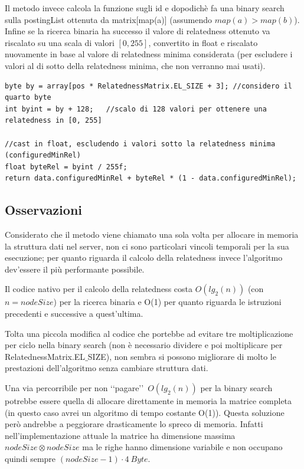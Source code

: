 Il metodo  invece calcola la funzione  sugli id  e  dopodichè fa una binary search sulla postingList 
ottenuta da matrix[map(a)] (assumendo $map(a) > map(b)$). Infine se la ricerca binaria ha successo il valore di relatedness ottenuto va riscalato su una scala di valori 
$[0, 255]$, convertito in float e riscalato nuovamente in base al valore di relatedness minima considerata (per escludere i valori al di sotto della relatedness minima,
che non verranno mai usati).  

\begin{lstlisting}[style=JavaStyle, caption=Conversione della relatedness da byte a float]
byte by = array[pos * RelatednessMatrix.EL_SIZE + 3]; //considero il quarto byte 
int byint = by + 128;   //scalo di 128 valori per ottenere una relatedness in [0, 255]

//cast in float, escludendo i valori sotto la relatedness minima (configuredMinRel)
float byteRel = byint / 255f; 
return data.configuredMinRel + byteRel * (1 - data.configuredMinRel);
\end{lstlisting}

\subsection{Osservazioni}
Considerato che il metodo  viene chiamato una sola volta per allocare in memoria la struttura dati nel server, 
non ci sono particolari vincoli temporali per la sua esecuzione; per quanto riguarda il calcolo della relatedness invece 
l'algoritmo dev'essere il più performante possibile.

Il codice nativo per il calcolo della relatedness costa $O(lg_2(n))$ (con $n=nodeSize$) per la ricerca binaria e O(1) per quanto riguarda le 
istruzioni precedenti e successive a quest'ultima.

Tolta una piccola modifica al codice che portebbe ad evitare tre moltiplicazione per ciclo nella binary search (non è necessario dividere e poi moltiplicare per 
RelatednessMatrix.EL$\_$SIZE), non sembra si possono migliorare di molto le prestazioni dell'algoritmo senza cambiare struttura dati.

Una via percorribile per non \lq\lq pagare\rq\rq\ $O(lg_2(n))$ per la binary search potrebbe essere quella di allocare direttamente in memoria la matrice 
completa (in questo caso avrei un algoritmo di tempo costante O(1)). Questa soluzione però andrebbe a peggiorare drasticamente lo spreco di memoria.
Infatti nell'implementazione attuale la matrice ha dimensione massima $nodeSize \otimes nodeSize$ ma le righe hanno dimensione variabile e 
non occupano quindi sempre $(nodeSize -1) \cdot 4\ Byte$.

